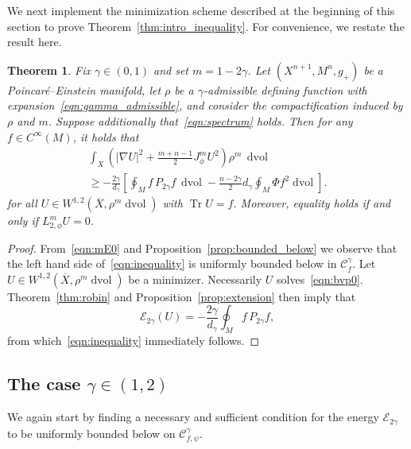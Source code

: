 \documentclass{amsart}
\newtheorem{thm}{Theorem}[section]
\theoremstyle{definition}
\theoremstyle{remark}
\numberwithin{equation}{section}
\begin{document}
We next implement the minimization scheme described at the beginning of this section to prove Theorem~\ref{thm:intro_inequality}.  For convenience, we restate the result here.

\begin{thm}
\label{thm:inequality}
 Fix $\gamma\in(0,1)$ and set $m=1-2\gamma$.  Let $(X^{n+1},M^n,g_+)$ be a Poincar\'e--Einstein manifold, let $\rho$ be a $\gamma$-admissible defining function with expansion~\eqref{eqn:gamma_admissible}, and consider the compactification induced by $\rho$ and $m$.  Suppose additionally that~\eqref{eqn:spectrum} holds.  Then for any $f\in C^\infty(M)$, it holds that
 \begin{multline}
  \label{eqn:inequality}
  \int_X \left({\lvert}\nabla U{\rvert}^2 + \frac{m+n-1}{2}J_\phi^m U^2\right) \rho^m\,\operatorname{dvol} \\ \geq -\frac{2\gamma}{d_\gamma}\left[ \oint_M f\,P_{2\gamma}f\,\operatorname{dvol} - \frac{n-2\gamma}{2}d_\gamma\oint_M\Phi f^2\operatorname{dvol} \right] .
 \end{multline}
 for all $U\in W^{1,2}({\overline{X}},\rho^m\operatorname{dvol})$ with $\operatorname{Tr} U=f$.  Moreover, equality holds if and only if $L_{2,\phi}^mU=0$.
\end{thm}

\begin{proof}
 From~\eqref{eqn:mE0} and Proposition~\ref{prop:bounded_below} we observe that the left hand side of~\eqref{eqn:inequality} is uniformly bounded below in ${\mathcal{C}}_f^\gamma$.  Let $U\in W^{1,2}({\overline{X}},\rho^m\operatorname{dvol})$ be a minimizer.  Necessarily $U$ solves~\eqref{eqn:bvp0}.  Theorem~\ref{thm:robin} and Proposition~\ref{prop:extension} then imply that
 \[ {\mathcal{E}}_{2\gamma}(U) = -\frac{2\gamma}{d_\gamma}\oint_M f\,P_{2\gamma}f, \]
 from which~\eqref{eqn:inequality} immediately follows.
\end{proof}

\subsection{The case $\gamma\in(1,2)$}
\label{subsec:inequality/2}

We again start by finding a necessary and sufficient condition for the energy ${\mathcal{E}}_{2\gamma}$ to be uniformly bounded below on ${\mathcal{C}}_{f,\psi}^\gamma$.
\end{document}
